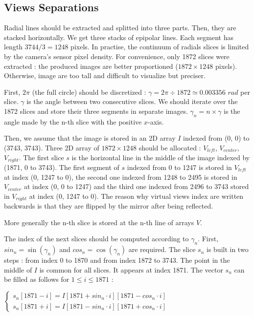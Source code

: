 \documentclass[a4paper,twocolumn,fleqn]{article}
\begin{document}
\subsection{Views Separations}
Radial lines should be extracted and splitted into three parts. Then, they are stacked horizontally. We get three stacks of epipolar lines. Each segment has length $3744 / 3 = 1248$ pixels. In practise, the continuum of radials slices is limited by the camera's sensor pixel density. For convenience, only 1872 slices were extracted : the produced images are better proportioned ($1872 \times 1248$ pixels). Otherwise, image are too tall and difficult to visualize but preciser.

First, $2\pi$ (the full circle) should be discretized : $\gamma = 2\pi \div 1872 \simeq 0.003356$ $rad$ per slice. $\gamma$ is the angle between two consecutive slices. We should iterate over the 1872 slices and store their three segments in separate images. $\gamma_{n} = n \times \gamma$ is the angle made by the n-th slice with the positive $x$-axis.

Then, we assume that the image is stored in an 2D array $I$ indexed from (0, 0) to (3743, 3743). Three 2D array of $1872 \times 1248$ should be allocated : $V_{left}$, $V_{center}$, $V_{right}$. The first slice $s$ is the horizontal line in the middle of the image indexed by (1871, 0 to 3743). The first segment of $s$ indexed from 0 to 1247 is stored in $V_{left}$ at index (0, 1247 to 0), the second one indexed from 1248 to 2495 is stored in $V_{center}$ at index (0, 0 to 1247) and the third one indexed from 2496 to 3743 stored in $V_{right}$ at index (0, 1247 to 0). The reason why virtual views index are written backwards is that they are flipped by the mirror after being reflected.

More generally the n-th slice is stored at the n-th line of arrays $V$.

The index of the next slices should be computed according to $\gamma_{n}$. First, $sin_{n} = \sin{(\gamma_{n})}$ and $cos_{n} = \cos{(\gamma_{n})}$ are required. The slice $s_{n}$ is built in two steps : from index 0 to 1870 and from index 1872 to 3743. The point in the middle of $I$ is common for all slices. It appears at index 1871. The vector $s_n$ can be filled as follows for $1 \leq i \leq 1871$ :

\begin{center}
$
\begin{cases}
  s_n[1871 - i] = I[1871 + sin_n \cdot i][1871 - cos_n \cdot i]\\
  s_n[1871 + i] = I[1871 - sin_n \cdot i][1871 + cos_n \cdot i]
\end{cases}
$
\end{center}
\end{document}

